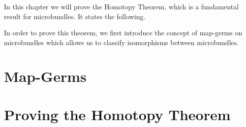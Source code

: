 \begin{myparagraph}
    In this chapter we will prove the Homotopy Theorem,
    which is a fundamental result for microbundles.
    It states the following.
\end{myparagraph}

\begin{myparagraph}
    In order to prove this theorem,
    we first introduce the concept of map-germs
    on microbundles which allows us to classify
    isomorphisms between microbundles.
\end{myparagraph}
\section{Map-Germs}\label{section::germs}




\section{Proving the Homotopy Theorem}\label{section::homotopy_prove}





